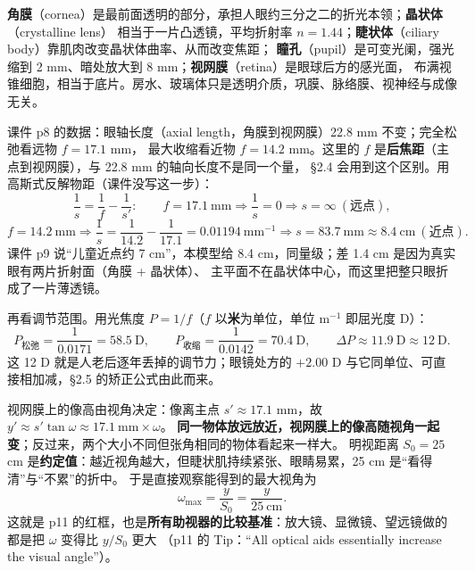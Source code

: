﻿\documentclass[11pt]{ctexart}
\begin{document}
\textbf{角膜}（cornea）是最前面透明的部分，承担人眼约三分之二的折光本领；\textbf{晶状体}（crystalline lens）
相当于一片凸透镜，平均折射率 $n=1.44$；\textbf{睫状体}（ciliary body）靠肌肉改变晶状体曲率、从而改变焦距；
\textbf{瞳孔}（pupil）是可变光阑，强光缩到 2 mm、暗处放大到 8 mm；\textbf{视网膜}（retina）是眼球后方的感光面，
布满视锥细胞，相当于底片。房水、玻璃体只是透明介质，巩膜、脉络膜、视神经与成像无关。



课件 p8 的数据：眼轴长度（axial length，角膜到视网膜）22.8 mm 不变；完全松弛看远物 $f=17.1$ mm，
最大收缩看近物 $f=14.2$ mm。这里的 $f$ 是\textbf{后焦距}（主点到视网膜），与 22.8 mm 的轴向长度不是同一个量，
§2.4 会用到这个区别。用高斯式反解物距（课件没写这一步）：
\[
\frac{1}{s}=\frac{1}{f}-\frac{1}{s'}:\qquad
f=17.1\ \mathrm{mm}\Rightarrow \frac{1}{s}=0\Rightarrow s=\infty\ (\text{远点}),
\]
\[
f=14.2\ \mathrm{mm}\Rightarrow \frac{1}{s}=\frac{1}{14.2}-\frac{1}{17.1}=0.01194\ \mathrm{mm^{-1}}
\Rightarrow s=83.7\ \mathrm{mm}\approx 8.4\ \mathrm{cm}\ (\text{近点}).
\]
课件 p9 说“儿童近点约 7 cm”，本模型给 8.4 cm，同量级；差 1.4 cm 是因为真实眼有两片折射面（角膜 + 晶状体）、
主平面不在晶状体中心，而这里把整只眼折成了一片薄透镜。

再看调节范围。用光焦度 $P=1/f$（$f$ 以\textbf{米}为单位，单位 $\mathrm{m^{-1}}$ 即屈光度 D）：
\[
P_{\text{松弛}}=\frac{1}{0.0171}=58.5\ \mathrm{D},\qquad
P_{\text{收缩}}=\frac{1}{0.0142}=70.4\ \mathrm{D},\qquad
\Delta P\approx 11.9\ \mathrm{D}\approx 12\ \mathrm{D}.
\]
这 12 D 就是人老后逐年丢掉的调节力；眼镜处方的 $+2.00$ D 与它同单位、可直接相加减，§2.5 的矫正公式由此而来。



视网膜上的像高由视角决定：像离主点 $s'\approx17.1$ mm，故 $y'\approx s'\tan\omega\approx17.1\ \mathrm{mm}\times\omega$。
\textbf{同一物体放远放近，视网膜上的像高随视角一起变}；反过来，两个大小不同但张角相同的物体看起来一样大。
明视距离 $S_0=25$ cm 是\textbf{约定值}：越近视角越大，但睫状肌持续紧张、眼睛易累，25 cm 是“看得清”与“不累”的折中。
于是直接观察能得到的最大视角为
\[
\omega_{\max}=\frac{y}{S_0}=\frac{y}{25\ \mathrm{cm}} .
\]
这就是 p11 的红框，也是\textbf{所有助视器的比较基准}：放大镜、显微镜、望远镜做的都是把 $\omega$ 变得比 $y/S_0$ 更大
（p11 的 Tip：“All optical aids essentially increase the visual angle”）。
\end{document}
